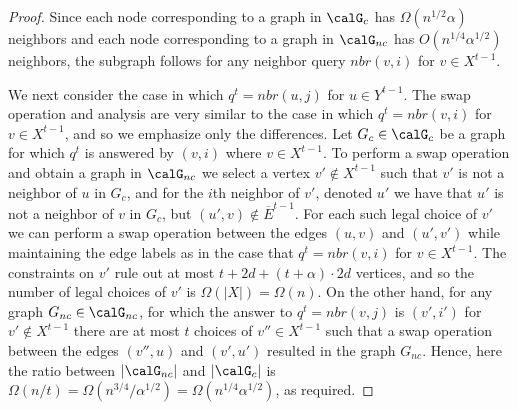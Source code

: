\begin{proof}
Since each node  corresponding to a graph in $\calG_c$ has $\Omega(n^{1/2}\alpha)$ neighbors and each node corresponding to a graph in $\calG_{nc}$ has $O(n^{1/4}\alpha^{1/2})$ neighbors, the subgraph follows for any neighbor query $nbr(v,i)$ for $v \in X^{t-1}$.

We next consider the case in which $q^t = nbr(u,j)$ for $u \in Y^{t-1}$. The swap operation and analysis are very similar to the case in which $q^t = nbr(v,i)$ for $v \in X^{t-1}$, and so we emphasize only the differences. Let  $G_c \in \calG_c$ be a graph for which $q^t$ is answered by $(v,i)$ where $v \in X^{t-1}$. To perform a swap operation and obtain a graph in $\calG_{nc}$ we select a vertex $v'\notin X^{t-1}$ such that $v'$ is not a neighbor of $u$ in $G_c$, and for the $i$th neighbor of $v'$, denoted $u'$ we have that
$u'$ is not a neighbor of $v$ in $G_c$, but
$(u',v)\notin \overline{E}^{t-1}$.  For each such legal choice of $v'$ we can perform a swap operation between the edges $(u,v)$ and $(u',v')$ while maintaining the edge labels as in the case that $q^t = nbr(v,i)$ for $v\in X^{t-1}$. The  constraints on $v'$ rule out at most $t+2d + (t+\alpha)\cdot 2d $ vertices, and so the number of legal choices of $v'$ is $\Omega(|X|) = \Omega(n)$. On the other hand, for any graph $G_{nc}\in \calG_{nc}$, for which the answer to $q^t = nbr(v,j)$ is $(v',i')$ for $v'\notin X^{t-1}$ there are at most $t$ choices of $v''\in X^{t-1}$ such that a swap operation between the edges $(v'',u)$ and $(v',u')$ resulted in the graph $G_{nc}$.
Hence, here the ratio between $|\calG_{nc}|$ and $|\calG_c|$ is $\Omega(n/t) = \Omega(n^{3/4}/\alpha^{1/2}) = \Omega(n^{1/4}\alpha^{1/2})$, as required.


\end{proof}
